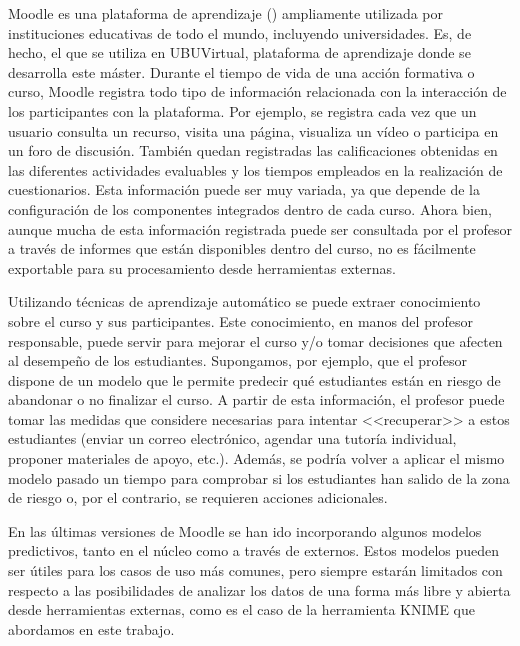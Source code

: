 
Moodle es una plataforma de aprendizaje () ampliamente utilizada por instituciones educativas de 
todo el mundo, incluyendo universidades. Es, de hecho, el  que se utiliza en UBUVirtual, plataforma de aprendizaje 
donde se desarrolla este máster. Durante el tiempo de vida de una acción formativa o curso, Moodle registra todo tipo de información relacionada con la interacción de los participantes con la plataforma.  Por ejemplo, 
 se registra cada vez que un usuario consulta un recurso, visita una página, visualiza un vídeo o participa en un foro de discusión. También quedan registradas las 
 calificaciones obtenidas en las diferentes actividades evaluables y los tiempos empleados en la realización de cuestionarios. Esta información puede ser muy variada, 
 ya que depende de la configuración de los componentes integrados dentro de cada curso. Ahora bien, aunque mucha de esta información registrada puede ser consultada por el profesor a través de informes que están disponibles dentro del curso, no es fácilmente exportable 
 para su procesamiento desde herramientas externas. 
\

Utilizando técnicas de aprendizaje automático se puede extraer conocimiento sobre el curso y sus participantes. Este conocimiento, en manos del profesor responsable, puede servir para mejorar el curso 
y/o tomar decisiones que afecten al desempeño de los estudiantes. Supongamos, por ejemplo, que el profesor dispone de un modelo que le permite predecir qué estudiantes están en riesgo de abandonar 
o no finalizar el curso. A partir de esta información, el profesor puede tomar las medidas que considere necesarias para intentar <<recuperar>> a estos 
estudiantes (enviar un correo electrónico, agendar una tutoría individual, proponer materiales de apoyo, etc.). Además, se podría volver a aplicar el mismo modelo pasado un tiempo para comprobar si los
 estudiantes han salido de la zona de riesgo o, por el contrario, se requieren acciones adicionales. 
\

En las últimas versiones de Moodle se han ido incorporando algunos modelos predictivos, tanto en el núcleo como a través de  externos. Estos modelos pueden ser útiles para los casos de uso más comunes,
pero siempre estarán limitados con respecto a las posibilidades de analizar los datos de una forma más libre y abierta desde herramientas externas, como es el caso de la herramienta KNIME que abordamos en este trabajo.
\

